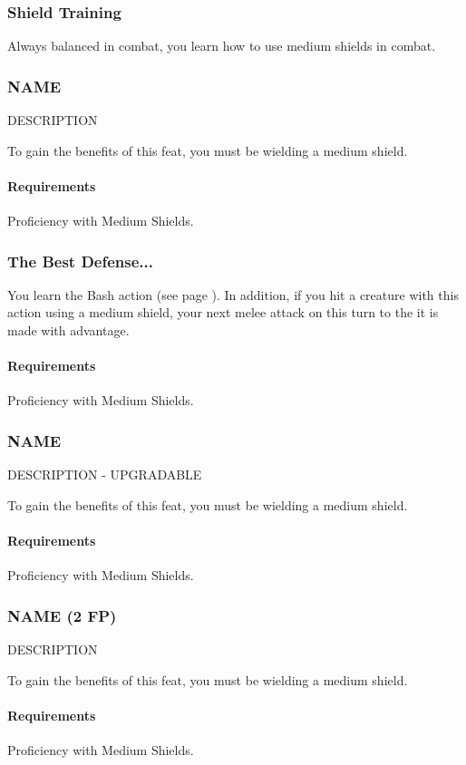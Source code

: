 \subsubsection{Shield Training} \label{feat::shieldtraining}
    Always balanced in combat, you learn how to use medium shields in combat.
\subsubsection{NAME} \label{feat::name}
    DESCRIPTION

    To gain the benefits of this feat, you must be wielding a medium shield.
    \paragraph{Requirements} Proficiency with Medium Shields.
\subsubsection{The Best Defense...} \label{feat::thebestdefense}
    You learn the Bash action (see page \pageref{act::bash}).
    In addition, if you hit a creature with this action using a medium shield, your next melee attack on this turn to the it is made with advantage.
    \paragraph{Requirements} Proficiency with Medium Shields.
\subsubsection{NAME} \label{feat::name}
    DESCRIPTION - UPGRADABLE

    To gain the benefits of this feat, you must be wielding a medium shield.
    \paragraph{Requirements} Proficiency with Medium Shields.
\subsubsection{NAME (2 FP)} \label{feat::name}
    DESCRIPTION

    To gain the benefits of this feat, you must be wielding a medium shield.
    \paragraph{Requirements} Proficiency with Medium Shields.
